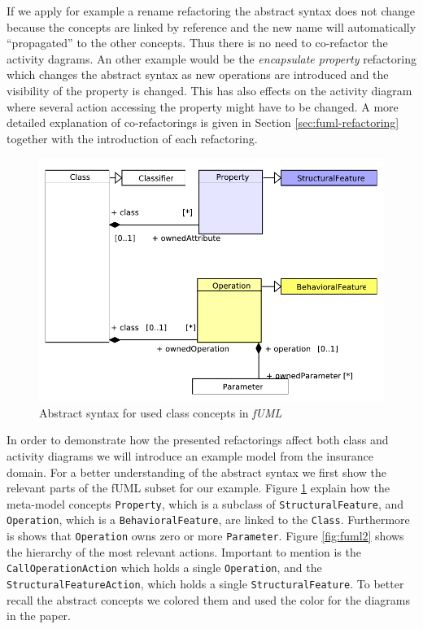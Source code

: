 \documentclass{llncs}
\begin{document}
If we apply for example a rename refactoring the abstract syntax does not change because the concepts are linked 
by reference and the new name will automatically ``propagated'' to the other concepts. Thus there is no need to 
co-refactor the activity dagrams. An other example would be the \textit{encapsulate property} refactoring which 
changes the abstract syntax as new operations are introduced and the visibility of the property is changed. This 
has also effects on the activity diagram where several action accessing the property might have to be changed. 
A more detailed explanation of
co-refactorings is given in Section \ref{sec:fuml-refactoring} together with the introduction of each refactoring.

\begin{figure}[h!t]
 \centering
 \includegraphics[scale=0.8]{images/Model_Model_Classifiers}
 \caption{Abstract syntax for used class concepts in \textit{fUML}}
 \label{fig:fuml1}
\end{figure}

In order to demonstrate how the presented refactorings affect both class and activity diagrams we will introduce an example 
model from the insurance domain. For a better understanding of the abstract syntax we first show the relevant parts of the fUML 
subset for our example. Figure \ref{fig:fuml1} explain how the meta-model concepts \texttt{Property}, which is a subclass of 
\texttt{Structural\-Feature}, and \texttt{Operation}, which is a \texttt{Behavioral\-Feature}, are linked to the \texttt{Class}. 
Furthermore is shows that \texttt{Operation} owns zero or more \texttt{Parameter}. Figure \ref{fig:fuml2} shows the hierarchy of 
the most relevant actions. Important to mention is the \texttt{Call\-Operation\-Action} which holds a single \texttt{Operation}, 
and the \texttt{Structural\-Feature\-Action}, which holds a single \texttt{Structural\-Feature}. To better recall the abstract 
concepts we colored them and used the color for the diagrams in the paper.
\end{document}
